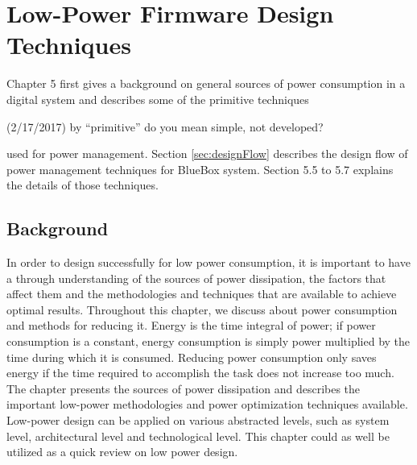 \chapter{Low-Power Firmware Design Techniques}

Chapter 5 first gives a background on general sources of power
consumption in a digital system and describes some of the primitive
techniques
\begin{cmtPai}
	(2/17/2017) by ``primitive'' do you mean simple, not developed?
\end{cmtPai}
used for power management. Section \ref{sec:designFlow} describes the design flow of
power management techniques for BlueBox system. Section 5.5 to 5.7
explains the details of those techniques.  

\section{Background}

In order to design successfully for low power consumption, it is important to have a through understanding of the sources of power dissipation, the factors that affect them and the methodologies and techniques that are available to achieve optimal results. 
Throughout this chapter, we discuss about power consumption and methods for reducing it. Energy is the time integral of power; if power consumption is a constant, energy consumption is simply power multiplied by the time during which it is consumed. Reducing power consumption only saves energy if the time required to accomplish the task does not increase too much. The chapter presents the sources of power dissipation and describes the important low-power methodologies and power optimization techniques available. Low-power design can be applied on various abstracted levels, such as system level, architectural level and technological level. This chapter could as well be utilized as a quick review on low power design. 

